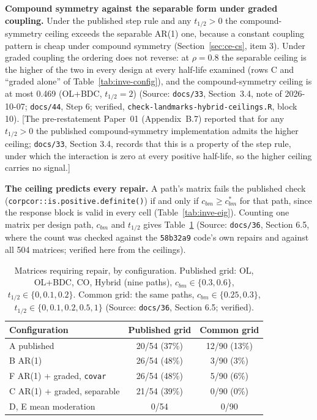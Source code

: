 \documentclass[11pt]{article}
\newcommand{\note}[1]{\textcolor{blue!60!black}{\small [#1]}}
\newcommand{\code}[1]{\texttt{#1}}
\begin{document}
\textbf{Compound symmetry against the separable form under graded
coupling.} Under the published step rule and any $t_{1/2} > 0$ the
compound-symmetry ceiling exceeds the separable AR(1) one, because a
constant coupling pattern is cheap under compound symmetry
(Section~\ref{sec:ce-cs}, item 3). Under graded coupling the ordering
does not reverse: at $\rho = 0.8$ the separable ceiling is the higher
of the two in every design at every half-life examined (rows C and
``graded alone'' of Table~\ref{tab:inve-config}), and the
compound-symmetry ceiling is at most 0.469 (OL+BDC, $t_{1/2} = 2$)
(Source: \code{docs/33}, Section~3.4, note of 2026-10-07; \code{docs/44},
Step 6; verified, \code{check-landmarks-hybrid-ceilings.R}, block 10).
\note{The pre-restatement Paper~01 (Appendix~B.7) reported that for
any $t_{1/2} > 0$ the published compound-symmetry implementation admits
the higher ceiling; \code{docs/33}, Section 3.4, records that this is a
property of the step rule, under which the interaction is zero at every
positive half-life, so the higher ceiling carries no signal.}

\textbf{The ceiling predicts every repair.} A path's matrix fails the
published check (\code{corpcor::}\allowbreak\code{is.positive.definite()}) if and only if
$c_{bm} \ge c_{bm}^{\ast}$ for that path, since the response block is
valid in every cell (Table~\ref{tab:inve-eig}). Counting one matrix per
design path, $c_{bm}$ and $t_{1/2}$ gives Table~\ref{tab:inve-repair}
(Source: \code{docs/36}, Section 6.5, where the count was checked
against the \code{58b32a9} code's own repairs and against all 504
matrices; verified here from the ceilings).

\begin{table}[h]
\centering\small
\caption{Matrices requiring repair, by configuration. Published grid:
OL, OL+BDC, CO, Hybrid (nine paths), $c_{bm} \in \{0.3, 0.6\}$,
$t_{1/2} \in \{0, 0.1, 0.2\}$. Common grid: the same paths,
$c_{bm} \in \{0.25, 0.3\}$, $t_{1/2} \in \{0, 0.1, 0.2, 0.5, 1\}$
(Source: \code{docs/36}, Section 6.5; verified).}
\label{tab:inve-repair}
\begin{tabular}{@{}lcc@{}}
\toprule
Configuration & Published grid & Common grid \\
\midrule
A published & 20/54 (37\%) & 12/90 (13\%) \\
B AR(1) & 26/54 (48\%) & 3/90 (3\%) \\
F AR(1) + graded, \code{covar} & 26/54 (48\%) & 5/90 (6\%) \\
C AR(1) + graded, separable & 21/54 (39\%) & 0/90 (0\%) \\
D, E mean moderation & 0/54 & 0/90 \\
\bottomrule
\end{tabular}
\end{table}
\end{document}
